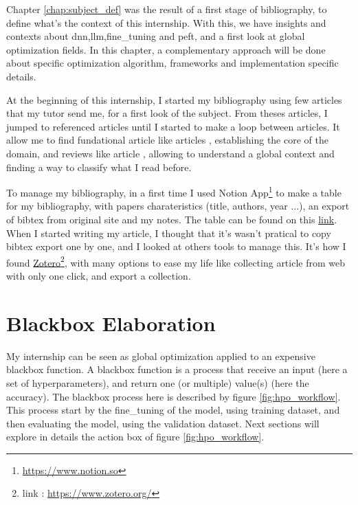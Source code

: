 Chapter \ref{chap:subject_def} was the result of a first stage of bibliography, to define what's the context of this internship. With this, we have insights and contexts about \acrshort{dnn},\acrshort{llm},\gls{fine_tuning} and \acrshort{peft}, and a first look at global optimization fields. In this chapter, a complementary approach will be done about specific optimization algorithm, frameworks and implementation specific details. 

At the beginning of this internship, I started my bibliography using few articles that my tutor send me, for a first look of the subject. From theses articles, I jumped to referenced articles until I started to make a loop between articles. It allow me to find fundational article like articles \cite{vaswani_attention_2017,talbi_automated_2021}, establishing the core of the domain, and reviews like article \cite{elsken_neural_2019,talbi_automated_2021}, allowing to understand a global context and finding a way to classify what I read before.

To manage my bibliography, in a first time I used Notion App\footnote{\href{https://www.notion.so}{https://www.notion.so}} to make a table for my bibliography, with papers charateristics (title, authors, year ...), an export of bibtex from original site and my notes. The table can be found on this \href{https://ribbon-crown-5f6.notion.site/6539799af4a24b32b6d4b91c4e07de49?v=b1542338391647aaa38cc8bb4ad1d5d8&pvs=4}{link}. When I started writing my article, I thought that it's wasn't pratical to copy bibtex export one by one, and I looked at others tools to manage this. It's how I found \href{https://www.zotero.org/}{Zotero}\footnote{link : \href{https://www.zotero.org/}{https://www.zotero.org/}}, with many options to ease my life like collecting article from web with only one click, and export a collection.

\section{Blackbox Elaboration}
\label{sec:blackbox}
My internship can be seen as global optimization applied to an expensive blackbox function. A blackbox function is a process that receive an input (here a set of hyperparameters), and return one (or multiple) value(s) (here the accuracy). The blackbox process here is described by figure \ref{fig:hpo_workflow}. This process start by the \gls{fine_tuning} of the model, using training dataset, and then evaluating the model, using the validation dataset. Next sections will explore in details the action box of figure \ref{fig:hpo_workflow}.


